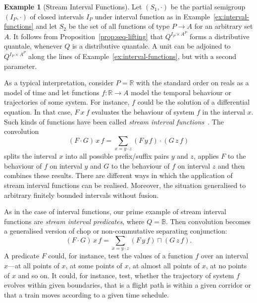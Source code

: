 \documentclass[12pt]{article}
\theoremstyle{definition}
\newtheorem{example}{Example}
\begin{document}
\begin{example}[Stream Interval
  Functions]\label{ex:stream-interval-functions}
  Let $(S_1,\cdot)$ be the partial semigroup $(I_P,\cdot)$ of closed
  intervals $I_P$ under interval function as in
  Example~\ref{ex:interval-functions} and let $S_2$ be the set of all
  functions of type $P\to A$ for an arbitrary set $A$. It follows from
  Proposition~\ref{prop:seq-lifting} that $Q^{I_P\times A^P}$ forms a
  distributive quantale, whenever $Q$ is a distributive quantale. A
  unit can be adjoined to $Q^{I_P\times A^P}$ along the lines of
  Example~\ref{ex:interval-functions}, but with a second parameter.

  As a typical interpretation, consider $P=\mathbb{R}$ with the
  standard order on reals as a model of time and let functions
  $f:\mathbb{R}\to A$ model the temporal behaviour or trajectories of
  some system. For instance, $f$ could be the solution of a
  differential equation. In that case, $F\ x\ f$ evaluates the
  behaviour of system $f$ in the interval $x$. Such kinds of functions
  have been called \emph{stream interval functions}~\cite{DHD14}. The
  convolution
  \begin{equation*}
    (F\cdot G)\, x\, f = \sum_{x=y\cdot z} (F\, y\, f) \cdot (G\, z\, f)
  \end{equation*}
  splits the interval $x$ into all possible prefix/suffix pairs $y$
  and $z$, applies $F$ to the behaviour of $f$ on interval $y$ and $G$
  to the behaviour of $f$ on interval $z$ and then combines these
  results. There are different ways in which the application of stream
  interval functions can be realised.  Moreover, the situation
  generalised to arbitrary finitely bounded intervals without fusion.

  As in the case of interval functions, our prime example of stream
  interval functions are \emph{stream interval predicates}, where
  $Q=\mathbb{B}$. Then convolution becomes a generalised version of
  chop or non-commutative separating conjunction:
 \begin{equation*}
    (F\cdot G)\, x\, f = \sum_{x=y\cdot z} (F\, y\, f) \sqcap (G\, z\, f).
  \end{equation*}
  A predicate $F$ could, for instance, test the values of a function
  $f$ over an interval $x$---at all points of $x$, at some points of
  $x$, at almost all points of $x$, at no points of $x$ and so on. It
  could, for instance, test, whether the trajectory of system $f$
  evolves within given boundaries, that is a flight path is within a
  given corridor or that a train moves according to a given time
  schedule.


\end{example}
\end{document}
